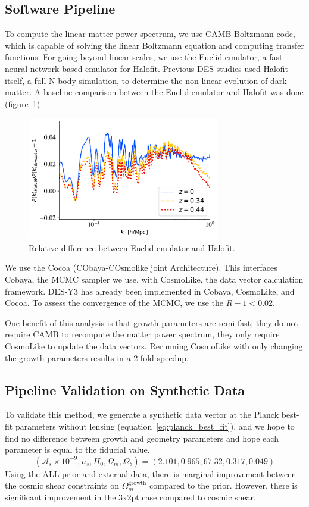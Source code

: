 \subsection{Software Pipeline}
To compute the linear matter power spectrum, we use \textsc{CAMB} Boltzmann code, which is capable of solving the linear Boltzmann equation and computing transfer functions. For going beyond linear scales, we use the Euclid emulator, a fast neural network based emulator for Halofit. Previous DES studies used Halofit itself, a full N-body simulation, to determine the non-linear evolution of dark matter. A baseline comparison between the Euclid emulator and Halofit was done (figure~\ref{fig:euc_v_halo})
\begin{figure}[ht]
	\centering
	\includegraphics[width=0.75\textwidth]{plots/halo_vs_emu.pdf}
	\caption{Relative difference between Euclid emulator and Halofit.}
	\label{fig:euc_v_halo}
\end{figure}
We use the Cocoa (CObaya-COsmolike joint Architecture). This interfaces Cobaya, the MCMC sampler we use, with CosmoLike, the data vector calculation framework. DES-Y3 has already been implemented in Cobaya, CosmoLike, and Cocoa. To assess the convergence of the MCMC, we use the $R-1<0.02$.

One benefit of this analysis is that growth parameters are semi-fast; they do not require CAMB to recompute the matter power spectrum, they only require CosmoLike to update the data vectors. Rerunning CosmoLike with only changing the growth parameters results in a 2-fold speedup.
\subsection{Pipeline Validation on Synthetic Data}
To validate this method, we generate a synthetic data vector at the Planck best-fit parameters without lensing (equation~\ref{eq:planck_best_fit}), and we hope to find no difference between growth and geometry parameters and hope each parameter is equal to the fiducial value.
\begin{equation}\label{eq:planck_best_fit}
	(\mathcal{A}_s\times10^{-9}, n_s, H_0, \Omega_m, \Omega_b) = (2.101,0.965,67.32,0.317,0.049)
\end{equation}
Using the ALL prior and external data, there is marginal improvement between the cosmic shear constraints on $\Omega_m^\mathrm{growth}$ compared to the prior. However, there is significant improvement in the 3x2pt case compared to cosmic shear. 

